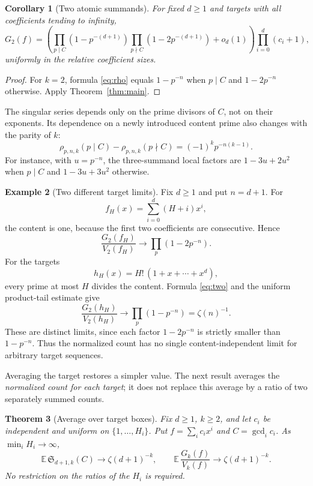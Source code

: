 \documentclass[11pt]{amsart}
\newcommand{\Ex}{\mathbb E}
\newcommand{\Sseries}{\mathfrak S}
\newtheorem{theorem}{Theorem}[section]
\newtheorem{corollary}[theorem]{Corollary}
\theoremstyle{definition}
\newtheorem{example}[theorem]{Example}
\theoremstyle{remark}
\begin{document}
\begin{corollary}[Two atomic summands]\label{cor:two}
For fixed $d\ge1$ and targets with all coefficients tending to infinity,
\begin{equation}\label{eq:two}
G_2(f)=\left(
\prod_{p\mid C}(1-p^{-(d+1)})
\prod_{p\nmid C}(1-2p^{-(d+1)})+o_d(1)
\right)\prod_{i=0}^d(c_i+1),
\end{equation}
uniformly in the relative coefficient sizes.
\end{corollary}

\begin{proof}
For $k=2$, formula \eqref{eq:rho} equals $1-p^{-n}$ when $p\mid C$
and $1-2p^{-n}$ otherwise. Apply Theorem~\ref{thm:main}.
\end{proof}

The singular series depends only on the prime divisors of $C$, not on
their exponents. Its dependence on a newly introduced content prime
also changes with the parity of $k$:
\begin{equation}\label{eq:parityeffect}
\rho_{p,n,k}(p\mid C)-\rho_{p,n,k}(p\nmid C)
=(-1)^kp^{-n(k-1)}.
\end{equation}
For instance, with $u=p^{-n}$, the three-summand local factors are
$1-3u+2u^2$ when $p\mid C$ and $1-3u+3u^2$ otherwise.

\begin{example}[Two different target limits]\label{ex:content}
Fix $d\ge1$ and put $n=d+1$. For
\[
f_H(x)=\sum_{i=0}^d(H+i)x^i,
\]
the content is one, because the first two coefficients are consecutive.
Hence
\[
\frac{G_2(f_H)}{V_2(f_H)}\longrightarrow
\prod_p(1-2p^{-n}).
\]
For the targets
\[
h_H(x)=H!\,(1+x+\cdots+x^d),
\]
every prime at most $H$ divides the content. Formula \eqref{eq:two}
and the uniform product-tail estimate give
\[
\frac{G_2(h_H)}{V_2(h_H)}\longrightarrow
\prod_p(1-p^{-n})=\zeta(n)^{-1}.
\]
These are distinct limits, since each factor $1-2p^{-n}$ is strictly
smaller than $1-p^{-n}$. Thus the normalized count has no single
content-independent limit for arbitrary target sequences.
\end{example}

Averaging the target restores a simpler value. The next result averages
the \emph{normalized count for each target}; it does not replace this
average by a ratio of two separately summed counts.

\begin{theorem}[Average over target boxes]\label{thm:average}
Fix $d\ge1$, $k\ge2$, and let $c_i$ be independent and uniform on
$\{1,\ldots,H_i\}$. Put $f=\sum_i c_ix^i$ and $C=\gcd_i c_i$.
As $\min_iH_i\to\infty$,
\begin{equation}\label{eq:averages}
\Ex\,\Sseries_{d+1,k}(C)\longrightarrow\zeta(d+1)^{-k},
\qquad
\Ex\,\frac{G_k(f)}{V_k(f)}\longrightarrow\zeta(d+1)^{-k}.
\end{equation}
No restriction on the ratios of the $H_i$ is required.
\end{theorem}
\end{document}
